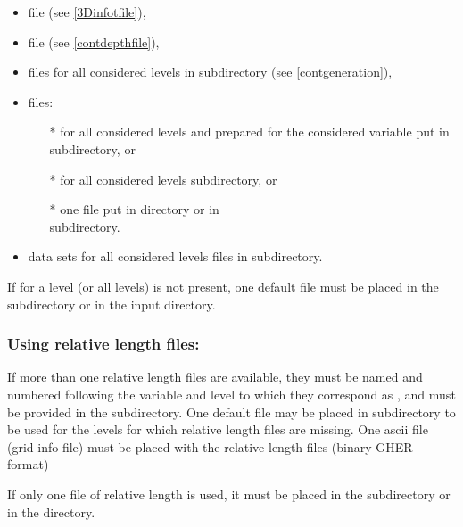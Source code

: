 \begin{itemize}
\item {} file (see \ref{3Dinfotfile}),
\item {} file (see \ref{contdepthfile}),
\item {} files for all considered levels in  subdirectory (see \ref{contgeneration}),
\item {} files:
\begin{itemize}
\item[*]  for all considered levels and prepared for the considered variable put in  subdirectory, or
\item[*]  for all considered levels  subdirectory, or
\item[*] one  file put in   directory or in\\ 
 subdirectory.
\end{itemize}
\item data sets for all considered levels  files in   subdirectory.
\end{itemize}


\btips
 If for a level (or all levels)  is not present, one default   file must be placed in the  subdirectory or in the input directory.
\etips

\subsubsection{ Using relative length files:}

If more than one relative length files are available, they must be  named and numbered following the variable and level to which they correspond as , and must be provided in the  subdirectory. One default file  may be placed in   subdirectory to be used for the levels for which relative length files are missing. One  ascii file (grid info file) must be placed with the relative length files (binary GHER format)

If only one  file of relative length is used, it must be placed in  the  subdirectory or in the  directory.

